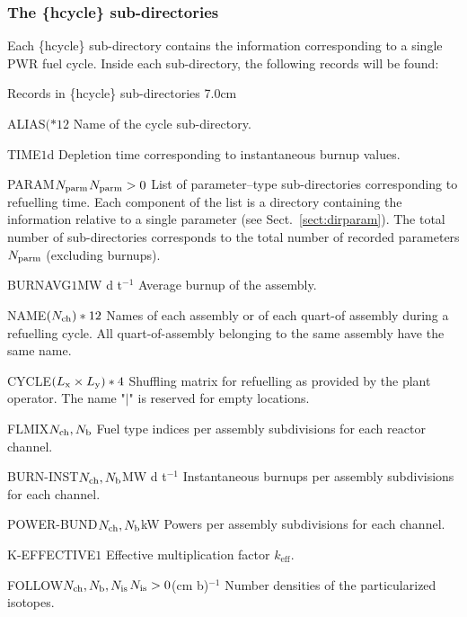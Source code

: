 \subsubsection{The \{hcycle\} sub-directories}\label{sect:dirhcycle}

Each \{hcycle\} sub-directory contains the information corresponding
to a single PWR fuel cycle. Inside each sub-directory, the following records
will be found:

\begin{DescriptionEnregistrement}{Records in \{hcycle\} sub-directories}
{7.0cm} \label{tabl:tabhcycle}

\CharEnr
 {ALIAS}{$(*12$}
 {Name of the cycle sub-directory.}

\RealEnr
 {TIME}{$1$}{d}
 {Depletion time corresponding to instantaneous burnup values.}

\OptDirlEnr
  {PARAM}{$N_{\rm parm}$}{$N_{\rm parm}>0$}
  {List of parameter--type sub-directories corresponding to refuelling time. Each component of the list is a directory
   containing the information relative to a single parameter (see Sect.~\ref{sect:dirparam}). The total number of sub-directories
   corresponds to the total number of recorded parameters $N_{\rm parm}$ (excluding  burnups).}

\RealEnr
 {BURNAVG}{$1$}{MW d t$^{-1}$}
 {Average burnup of the assembly.}

\CharEnr
 {NAME}{$(N_{\rm ch})*12$}
 {Names of each assembly or of each quart-of assembly during a refuelling cycle. All
 quart-of-assembly belonging to the same assembly have the same name.}

\CharEnr
 {CYCLE}{$(L_{\rm x}\times L_{\rm y})*4$}
 {Shuffling matrix for refuelling as provided by the plant operator. The name "$|$"
 is reserved for empty locations.}

\IntEnr
 {FLMIX}{$N_{\rm ch}, N_{\rm b}$}
 {Fuel type indices per assembly subdivisions for each reactor channel.}

\RealEnr
 {BURN-INST}{$N_{\rm ch}, N_{\rm b}$}{MW d t$^{-1}$}
 {Instantaneous burnups per assembly subdivisions for each channel.}

\RealEnr
 {POWER-BUND}{$N_{\rm ch}, N_{\rm b}$}{kW}
 {Powers per assembly subdivisions for each channel.}

\RealEnr
 {K-EFFECTIVE}{$1$}{}
 {Effective multiplication factor $k_{\mathrm{eff}}$.}

\OptRealEnr
 {FOLLOW}{$N_{\rm ch}, N_{\rm b}, N_{\rm is}$}{$N_{\rm is}>0$}{(cm b)$^{-1}$}
 {Number densities of the particularized isotopes.}

\end{DescriptionEnregistrement}

